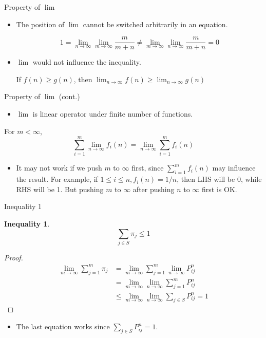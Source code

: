 \documentclass{beamer}
\newtheorem{ineq}{Inequality}
\begin{document}
\begin{frame}{Property of $\lim$}
	\begin{itemize}
		\item The position of $\lim$ cannot be switched arbitrarily in an equation.
			\begin{example}
				\[
				1 = \lim_{n \to \infty}\lim_{m \to \infty} \frac{m}{m+n} \neq
				\lim_{m \to \infty}\lim_{n \to \infty} \frac{m}{m+n} = 0
				\]
			\end{example}
		\item $\lim$ would not influence the inequality.
			\begin{example}
				\begin{center}
					If $f(n) \geq g(n)$, then
					$\lim_{n \to \infty} f(n) \geq \lim_{n \to \infty} g(n)$
				\end{center}
			\end{example}
	\end{itemize}
\end{frame}

\begin{frame}{Property of $\lim$ (cont.)}
	\begin{itemize}
		\item $\lim$ is linear operator under finite number of functions.
	\end{itemize}
	\begin{example}
		For $m < \infty$,
		\[
		\sum_{i=1}^m \lim_{n \to \infty} f_i(n) = \lim_{n \to \infty} \sum_{i=1}^m f_i(n)
		\]
	\end{example}
	\begin{itemize}
		\item It may not work if we push $m$ to $\infty$ first, since $\sum_{i=1}^m f_i(n)$ may influence the result.
			For example, if $1 \leq i \leq n, f_i(n) = 1/n$, then LHS will be 0, while RHS will be 1.
			But pushing $m$ to $\infty$ after pushing $n$ to $\infty$ first is OK.
	\end{itemize}
\end{frame}

\begin{frame}{Inequality 1}
	\begin{ineq}
		\[
		\sum_{j \in S} \pi_j \leq 1
		\]
	\end{ineq}
\end{frame}

\begin{frame}
	\begin{proof}
		\begin{align*}
			\lim_{m \to \infty} \sum_{j=1}^m \pi_j &= \lim_{m \to \infty} \sum_{j=1}^m \lim_{n \to \infty} P^n_{ij} \\
			&= \lim_{m \to \infty} \lim_{n \to \infty} \sum_{j=1}^m P^n_{ij} \\
			&\leq \lim_{m \to \infty} \lim_{n \to \infty} \sum_{j \in S} P^n_{ij} = 1
		\end{align*}
	\end{proof}
	\begin{itemize}
		\item The last equation works since $\sum_{j \in S} P^n_{ij} = 1$.
	\end{itemize}
\end{frame}
\end{document}
